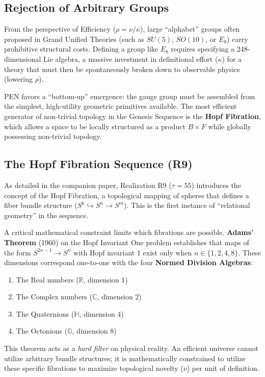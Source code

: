 \documentclass[12pt,a4paper]{article}
\theoremstyle{definition}
\newcommand{\R}{\mathbb{R}}
\newcommand{\C}{\mathbb{C}}
\newcommand{\HH}{\mathbb{H}}
\newcommand{\OO}{\mathbb{O}}
\newcommand{\kap}{\kappa}
\begin{document}
\subsection{Rejection of Arbitrary Groups}

From the perspective of Efficiency ($\rho = \nu/\kap$), large ``alphabet'' groups often proposed in Grand Unified Theories (such as $SU(5)$, $SO(10)$, or $E_8$) carry prohibitive structural costs. Defining a group like $E_8$ requires specifying a 248-dimensional Lie algebra, a massive investment in definitional effort ($\kap$) for a theory that must then be spontaneously broken down to observable physics (lowering $\rho$).

PEN favors a ``bottom-up'' emergence: the gauge group must be assembled from the simplest, high-utility geometric primitives available. The most efficient generator of non-trivial topology in the Genesis Sequence is the \textbf{Hopf Fibration}, which allows a space to be locally structured as a product $B \times F$ while globally possessing non-trivial topology.

\subsection{The Hopf Fibration Sequence (R9)}

As detailed in the companion paper, Realization R9 ($\tau=55$) introduces the concept of the Hopf Fibration, a topological mapping of spheres that defines a fiber bundle structure ($S^k \hookrightarrow S^n \to S^m$). This is the first instance of ``relational geometry'' in the sequence.

A critical mathematical constraint limits which fibrations are possible. \textbf{Adams' Theorem} (1960) on the Hopf Invariant One problem establishes that maps of the form $S^{2n-1} \to S^n$ with Hopf invariant 1 exist only when $n \in \{1, 2, 4, 8\}$. These dimensions correspond one-to-one with the four \textbf{Normed Division Algebras}:
\begin{enumerate}[leftmargin=2em]
    \item The Real numbers ($\R$, dimension 1)
    \item The Complex numbers ($\C$, dimension 2)
    \item The Quaternions ($\HH$, dimension 4)
    \item The Octonions ($\OO$, dimension 8)
\end{enumerate}

This theorem acts as a \emph{hard filter} on physical reality. An efficient universe cannot utilize arbitrary bundle structures; it is mathematically constrained to utilize these specific fibrations to maximize topological novelty ($\nu$) per unit of definition.
\end{document}
